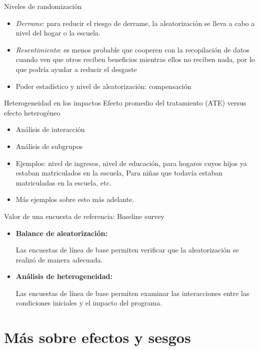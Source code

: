 \documentclass[11pt, aspectratio=169, compress]{beamer}
\begin{document}
\begin{frame}{Niveles de randomización}
	\begin{itemize}
		\item \textit{Derrame}: para reducir el riesgo de derrame, la aleatorización se lleva a cabo a nivel del hogar o la escuela.
		\item \textit{Resentimiento}: es menos probable que cooperen con la recopilación de datos cuando ven que otros reciben beneficios mientras ellos no reciben nada, por lo que podría ayudar a reducir el desgaste
		\item Poder estadístico y nivel de aleatorización: compensación
	\end{itemize}
\end{frame}
\begin{frame}{Heterogeneidad en los impactos}
	Efecto promedio del tratamiento (ATE) versus efecto heterogéneo
	\begin{itemize}
		\item Análisis de interacción
		\item Análisis de subgrupos
		\item Ejemplos: nivel de ingresos, nivel de educación, para hogares cuyos hijos ya estaban matriculados
		en la escuela, Para niñas que todavía estaban matriculadas en la escuela, etc.
    \item Más ejemplos sobre esto más adelante.
	\end{itemize}
\end{frame}
\begin{frame}{Valor de una encuesta de referencia: Baseline survey}
	\begin{itemize}
		\item \textbf{Balance de aleatorización:} 
					
		Las encuestas de línea de base permiten verificar que la aleatorización se realizó de manera adecuada.
		
		\item \textbf{Análisis de heterogeneidad:} 
				
		Las encuestas de línea de base permiten examinar las interacciones entre las condiciones iniciales y el impacto del programa.
	\end{itemize}
\end{frame}
\section{Más sobre efectos y sesgos}
\end{document}
